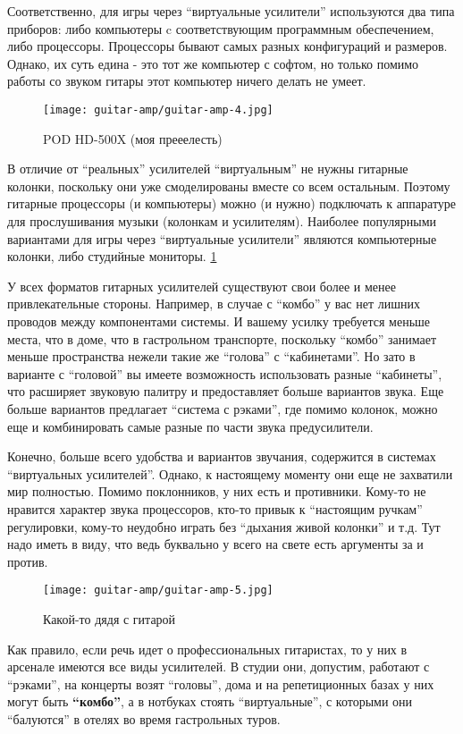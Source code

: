 Соответственно, для игры через “виртуальные усилители” используются два типа приборов: либо компьютеры c соответствующим программным обеспечением, либо процессоры. Процессоры бывают самых разных конфигураций и размеров. Однако, их суть едина - это тот же компьютер с софтом, но только помимо работы со звуком гитары этот компьютер ничего делать не умеет.
\begin{figure}[h]
\texttt{[image: guitar-amp/guitar-amp-4.jpg]}
\caption{POD HD-500X (моя прееелесть)}
\label{guitar-amp:POD-HD500X}
\end{figure}
В отличие от “реальных” усилителей “виртуальным” не нужны гитарные колонки, поскольку они уже смоделированы вместе со всем остальным. Поэтому гитарные процессоры (и компьютеры) можно (и нужно) подключать к аппаратуре для прослушивания музыки (колонкам и усилителям). Наиболее популярными вариантами для игры через “виртуальные усилители” являются компьютерные колонки, либо студийные мониторы. \ref{guitar-amp:POD-HD500X} %

У всех форматов гитарных усилителей существуют свои более и менее привлекательные стороны. Например, в случае с “комбо” у вас нет лишних проводов между компонентами системы. И вашему усилку требуется меньше места, что в доме, что в гастрольном транспорте, поскольку “комбо” занимает меньше пространства нежели такие же “голова” с “кабинетами”. Но зато в варианте с “головой” вы имеете возможность использовать разные “кабинеты”, что расширяет звуковую палитру и предоставляет больше вариантов звука. Еще больше вариантов предлагает “система с рэками”, где помимо колонок, можно еще и комбинировать самые разные по части звука предусилители.

Конечно, больше всего удобства и вариантов звучания, содержится в системах “виртуальных усилителей”. Однако, к настоящему моменту они еще не захватили мир полностью. Помимо поклонников, у них есть и противники. Кому-то не нравится характер звука процессоров, кто-то привык к “настоящим ручкам” регулировки, кому-то неудобно играть без “дыхания живой колонки” и т.д. Тут надо иметь в виду, что ведь буквально у всего на свете есть аргументы за и против.
\begin{figure}[h]
\texttt{[image: guitar-amp/guitar-amp-5.jpg]}
\caption{Какой-то дядя с гитарой}
\label{guitar-amp:man-with-guitar}
\end{figure}

Как правило, если речь идет о профессиональных гитаристах, то у них в арсенале имеются все виды усилителей. В студии они, допустим, работают с “рэками”, на концерты возят “головы”, дома и на репетиционных базах у них могут быть \textbf{“комбо”}, а в нотбуках стоять “виртуальные”, с которыми они “балуются” в отелях во время гастрольных туров.

